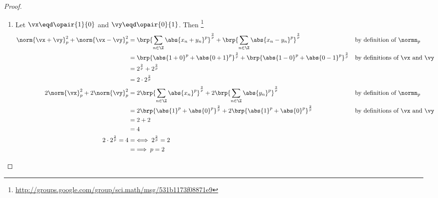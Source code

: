 \begin{proof}
\begin{enumerate}
\begin{enumerate}
      \item Let $\vx\eqd\opair{1}{0}$ and $\vy\eqd\opair{0}{1}$. Then
            \footnote{\url{http://groups.google.com/group/sci.math/msg/531b1173f08871e9}}\\
        \begin{align*}
          \norm{\vx+\vy}_p^2 + \norm{\vx-\vy}_p^2
            &= \brp{\sum_{n\in\Z} \abs{x_n+y_n}^p}^\frac{2}{p} +
               \brp{\sum_{n\in\Z} \abs{x_n-y_n}^p}^\frac{2}{p}
            && \text{by definition of $\normn_p$}
          \\&= \brp{\abs{1+0}^p + \abs{0+1}^p}^\frac{2}{p} +
               \brp{\abs{1-0}^p + \abs{0-1}^p}^\frac{2}{p}
            && \text{by definitions of $\vx$ and $\vy$}
          \\&= 2^\frac{2}{p} + 2^\frac{2}{p}
          \\&= 2\cdot2^\frac{2}{p}
          \\
          2\norm{\vx}_p^2 + 2\norm{\vy}_p^2
            &= 2\brp{\sum_{n\in\Z} \abs{x_n}^p}^\frac{2}{p} +
               2\brp{\sum_{n\in\Z} \abs{y_n}^p}^\frac{2}{p}
            && \text{by definition of $\normn_p$}
          \\&= 2\brp{\abs{1}^p + \abs{0}^p}^\frac{2}{p} +
               2\brp{\abs{1}^p + \abs{0}^p}^\frac{2}{p}
            && \text{by definitions of $\vx$ and $\vy$}
          \\&= 2 + 2
          \\&= 4
          \\
          2\cdot2^\frac{2}{p} = 4
            &= \iff 2^\frac{2}{p} = 2
          \\&= \implies p=2
        \end{align*}


\end{enumerate}
\end{enumerate}
\end{proof}
